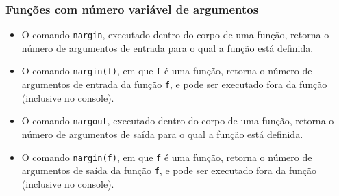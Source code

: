 \documentclass{beamer}
\newcommand{\code}[1]{{\texttt{#1}}}
\newcommand{\acode}[1]{\alert{\texttt{#1}}}
\newcommand{\file}[3]{\texttt{
   \begin{center}
      \begin{tikzpicture}
         \node[mybox] (box) {
            \begin{minipage}{#1}
               #3
            \end{minipage}
         };
         \node[draw, fill=white, text=black, right=10pt, rounded corners] at (box.north west) {
            \textbf{#2}
         };
      \end{tikzpicture}
   \end{center}}
}
\begin{document}
\begin{frame}
   \frametitle{Funções com número variável de argumentos}
   \begin{itemize}
      \item O comando \acode{nargin}, executado dentro do corpo de uma função, retorna o número de argumentos de entrada para o qual a função está definida.
      \item O comando \acode{nargin(f)}, em que \code{f} é uma função, retorna o número de argumentos de entrada da função \code{f}, e pode ser executado fora da função (inclusive no console).
      \item O comando \acode{nargout}, executado dentro do corpo de uma função, retorna o número de argumentos de saída para o qual a função está definida.
      \item O comando \acode{nargin(f)}, em que \code{f} é uma função, retorna o número de argumentos de saída da função \code{f}, e pode ser executado fora da função (inclusive no console).
   \end{itemize}
\end{frame}
\end{document}

